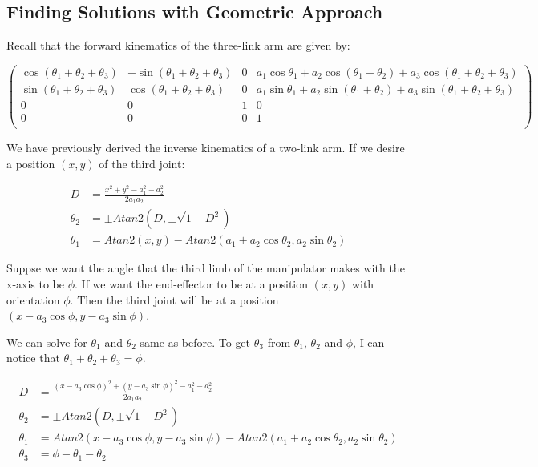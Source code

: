 \documentclass{article}
\begin{document}
\subsection{Finding Solutions with Geometric Approach}

Recall that the forward kinematics of the three-link arm are given by:

\[ \left( \begin{matrix}
		\cos \left( \theta_1 + \theta_2 + \theta_3 \right) 
			& - \sin \left( \theta_1 + \theta_2 + \theta_3 \right)
			& 0 
			& a_1 \cos \theta_1 + a_2 \cos \left( \theta_1 + \theta_2 \right)
				+ a_3 \cos \left( \theta_1 + \theta_2 + \theta_3 \right) \\
		\sin \left( \theta_1 + \theta_2 + \theta_3 \right) 
			& \cos \left( \theta_1 + \theta_2 + \theta_3 \right)
			& 0 
			& a_1 \sin \theta_1 + a_2 \sin \left( \theta_1 + \theta_2 \right)
				+ a_3 \sin \left( \theta_1 + \theta_2 + \theta_3 \right) \\
		0 & 0 & 1 & 0 \\
		0 & 0 & 0 & 1 \\
	\end{matrix} \right) \]

We have previously derived the inverse kinematics of a two-link arm.
If we desire a position $(x,y)$ of the third joint:

\begin{align*}
D & = \frac{x^2 + y^2 - a_1^2 - a_2^2}{2 a_1 a_2} \\
\theta_2 & =\pm Atan2(D, \pm \sqrt{1 - D^2})\\
\theta_1 & = Atan2(x, y) - Atan2(a_1 + a_2 \cos{\theta_2} , a_2 \sin{\theta_2})
\end{align*}

Suppse we want the angle that the third limb of the manipulator makes with the x-axis
	to be $\phi$.
If we want the end-effector to be at a position $(x,y)$ with orientation
	$\phi$.
Then the third joint will be at a position 
	$(x - a_3 \cos \phi, y - a_3 \sin \phi)$.

We can solve for $\theta_1$ and $\theta_2$ same as before.
To get $\theta_3$ from $\theta_1$, $\theta_2$ and $\phi$,
	I can notice that $\theta_1 + \theta_2 + \theta_3 = \phi$.

\begin{align*}
D & = \frac{(x-a_3 \cos \phi)^2 + (y - a_3 \sin \phi)^2 - a_1^2 - a_2^2}{2 a_1 a_2} \\
\theta_2 & = \pm Atan2(D, \pm \sqrt{1 - D^2})\\
\theta_1 & = Atan2(x - a_3 \cos \phi, y - a_3 \sin \phi) - Atan2(a_1 + a_2 \cos{\theta_2} , a_2 \sin{\theta_2})\\
\theta_3 & = \phi - \theta_1 - \theta_2
\end{align*}
\end{document}
